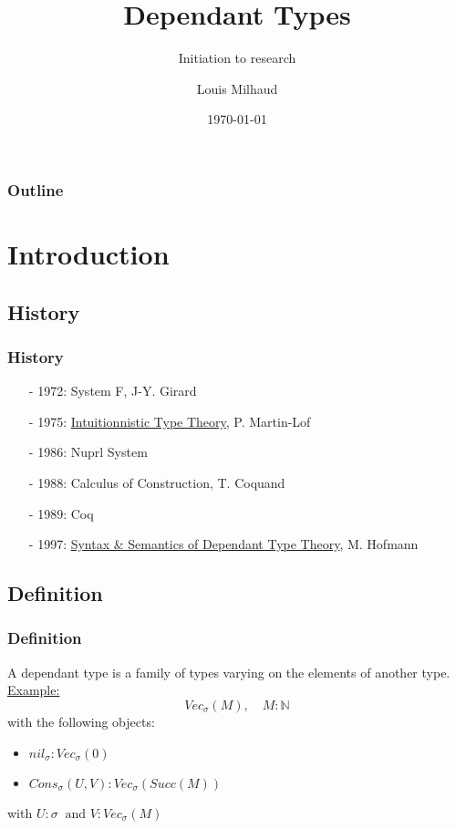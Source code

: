 \documentclass[aspectratio=169]{beamer}
\title{Dependant Types}
\subtitle{Initiation to research}
\author{Louis Milhaud}
\institute{Université Paris Saclay}
\date{\today}
\newcommand{\N}{\mathbb{N}}
\begin{document}
    \begin{frame}
        \titlepage
    \end{frame}
    \begin{frame}
        \frametitle{Outline}
        \tableofcontents
    \end{frame}
    \section{Introduction}
    \subsection{History}
    \begin{frame}
        \frametitle{History}
        \begin{itemize}
            \item[-] 1972: System F, J-Y. Girard
            \item[-] 1975: \underline{Intuitionnistic Type Theory}, P. Martin-Lof
            \item[-] 1986: Nuprl System
            \item[-] 1988: Calculus of Construction, T. Coquand  
            \item[-] 1989: Coq
            \item[-] 1997: \underline{Syntax \& Semantics of Dependant Type Theory}, M. Hofmann 
        \end{itemize}
    \end{frame}
    \subsection{Definition}
    \begin{frame}
        \frametitle{Definition}
        A dependant type is a family of types varying on the elements of another type.\\
        \vspace{20pt}
        \underline{Example:}\\
        $$Vec_\sigma(M),\quad M:\N $$
        with the following objects:
        \begin{itemize}
            \item $nil_\sigma : Vec_\sigma(0)$
            \item $Cons_\sigma(U, V) : Vec_\sigma(Succ(M))$ 
        \end{itemize}
        with $ U : \sigma\ \text{ and } V : Vec_\sigma(M)$
    \end{frame}
\end{document}
